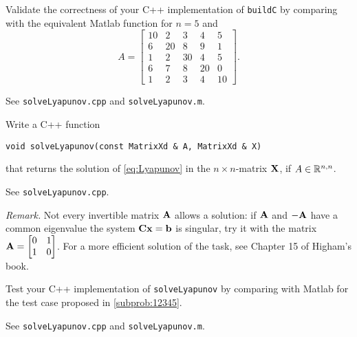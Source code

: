 \begin{problem}
\begin{subproblem}[1]\label{subprob:12345}
Validate the correctness of your C++ implementation of \texttt{buildC} by comparing with the equivalent Matlab function for $n=5$ and
\[
A=\begin{bmatrix}
10 & 2 & 3 & 4 & 5 \\
6 & 20 & 8 & 9 & 1\\
1 & 2 & 30 & 4 & 5 \\
6 & 7 & 8 & 20 & 0\\
1 & 2 & 3 & 4 & 10
\end{bmatrix}.
\]
\begin{solution}
See \texttt{solveLyapunov.cpp}  and \texttt{solveLyapunov.m}.
\end{solution}
\end{subproblem}

\begin{subproblem}[2]
Write a C++ function

\texttt{void solveLyapunov(const MatrixXd \& A, MatrixXd \& X)}

that returns the solution of \eqref{eq:Lyapunov} in the $n\times n$-matrix ${\mathbf{X}}$, if $A\in \mathbb{R}^{n,n}$.
\begin{solution}
See \texttt{solveLyapunov.cpp}.

\emph{Remark.} Not every invertible matrix ${\mathbf{A}}$ allows a solution: if ${\mathbf{A}}$ and
$-{\mathbf{A}}$ have a common eigenvalue the system ${\mathbf{C}}{\mathbf{x}}={\mathbf{b}}$ is singular, try it with
the matrix ${\mathbf{A}}=\begin{bmatrix}0 &1\\1 & 0\end{bmatrix}$. For a more efficient
solution of the task, see Chapter 15 of Higham's book.
\end{solution}
\end{subproblem}

\begin{subproblem}[2]
Test your C++ implementation of \texttt{solveLyapunov} by comparing with Matlab for the test case proposed in \ref{subprob:12345}.

\begin{solution}
See \texttt{solveLyapunov.cpp} and \texttt{solveLyapunov.m}.
\end{solution}
\end{subproblem}
\end{problem}
